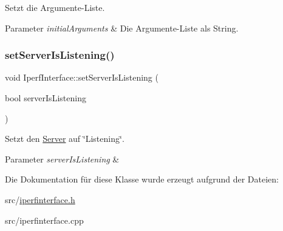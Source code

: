 Setzt die Argumente-\/\+Liste. 


\begin{DoxyParams}{Parameter}
{\em initial\+Arguments} & Die Argumente-\/\+Liste als String. \\
\hline
\end{DoxyParams}
\hypertarget{class_iperf_interface_a012e33d4dcb33373c302cf1282b3056b}{}\label{class_iperf_interface_a012e33d4dcb33373c302cf1282b3056b} 
\subsubsection{\texorpdfstring{set\+Server\+Is\+Listening()}{setServerIsListening()}}
{\footnotesize\ttfamily void Iperf\+Interface\+::set\+Server\+Is\+Listening (\begin{DoxyParamCaption}\item[{bool}]{server\+Is\+Listening }\end{DoxyParamCaption})}



Setzt den \hyperlink{class_server}{Server} auf \char`\"{}\+Listening\char`\"{}. 


\begin{DoxyParams}{Parameter}
{\em server\+Is\+Listening} & \\
\hline
\end{DoxyParams}


Die Dokumentation für diese Klasse wurde erzeugt aufgrund der Dateien\+:\begin{DoxyCompactItemize}
\item 
src/\hyperlink{iperfinterface_8h}{iperfinterface.\+h}\item 
src/iperfinterface.\+cpp\end{DoxyCompactItemize}
